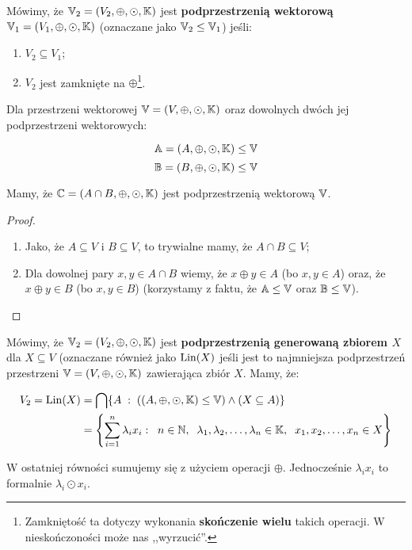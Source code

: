 \begin{definition}
	Mówimy, że \(\mathbb{V}_2 = (V_2, \oplus, \odot, \mathbb{K})\) jest \textbf{podprzestrzenią wektorową} \(\mathbb{V}_1 = (V_1, \oplus, \odot, \mathbb{K})\) (oznaczane jako \(\mathbb{V}_2 \leq \mathbb{V}_1\)) jeśli:

	\begin{enumerate}
		\item \( V_2 \subseteq V_1\);
		\item \(V_2\) jest zamknięte na \(\oplus\)\footnote{Zamkniętość ta dotyczy wykonania \textbf{skończenie wielu} takich operacji. W nieskończoności może nas ,,wyrzucić''.}.
	\end{enumerate}
\end{definition}


\begin{lemma}
	Dla przestrzeni wektorowej \(\mathbb{V} = (V, \oplus, \odot, \mathbb{K})\) oraz dowolnych dwóch jej podprzestrzeni wektorowych:

	\[
		\mathbb{A} = (A, \oplus, \odot, \mathbb{K}) \leq \mathbb{V}
	\]
	\[
		\mathbb{B} = (B, \oplus, \odot, \mathbb{K}) \leq \mathbb{V}
	\]

	Mamy, że \(\mathbb{C} = (A \cap B, \oplus, \odot, \mathbb{K})\) jest podprzestrzenią wektorową \(\mathbb{V}\).
\end{lemma}
\begin{proof}
	\begin{enumerate}
		\item Jako, że \(A \subseteq V\) i \(B \subseteq V\), to trywialne mamy, że \( A \cap B \subseteq V\);
		\item Dla dowolnej pary \(x, y \in A \cap B\) wiemy, że \(x \oplus y \in A\) (bo \(x, y \in A\)) oraz, że \(x \oplus y \in B\) (bo \(x, y \in B\)) (korzystamy z faktu, że \(\mathbb{A} \leq \mathbb{V}\) oraz \( \mathbb{B} \leq \mathbb{V}\)).
	\end{enumerate}
\end{proof}

\begin{definition}
	Mówimy, że \(\mathbb{V}_2 = (V_2, \oplus, \odot, \mathbb{K})\) jest \textbf{podprzestrzenią generowaną zbiorem \(X\)} dla \(X \subseteq V\) (oznaczane również jako \({\mathrm{Lin}}(X)\) jeśli jest to najmniejsza podprzestrzeń przestrzeni \( \mathbb{V} = (V, \oplus, \odot, \mathbb{K})\) zawierająca zbiór \(X\). Mamy, że:

	\begin{align*}
		V_2 = \lin(X) & = \bigcap \set{A \; : \; ((A, \oplus, \odot, \field) \leq \vfield) \land (X \subseteq A)}                                                              \\
		              & = \set{\sum_{i=1}^{n} \lambda_i x_i : \; \; n \in \natural, \; \; \lambda_1, \lambda_2, \dots, \lambda_n \in \field, \; \; x_1, x_2, \dots, x_n \in X}
	\end{align*}

	W ostatniej równości sumujemy się z użyciem operacji \( \oplus \). Jednocześnie \(\lambda_i x_i\) to formalnie \(\lambda_i \odot x_i\).

\end{definition}

